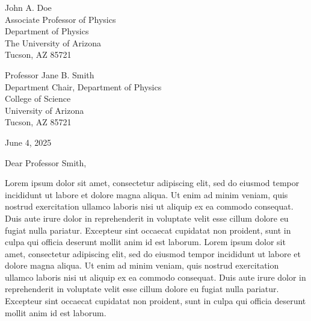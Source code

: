 \documentclass[11pt]{letter}
\begin{document}
\vspace*{2\baselineskip}

{\hfill
\begin{minipage}{0.45\textwidth}
John A. Doe\\
Associate Professor of Physics\\
Department of Physics\\
The University of Arizona\\
Tucson, AZ 85721\\
\end{minipage}
}

\vspace{1\baselineskip}

\begin{minipage}{0.45\textwidth}
Professor Jane B. Smith\\
Department Chair, Department of Physics\\
College of Science\\
University of Arizona\\
Tucson, AZ 85721
\end{minipage}

\vspace{1\baselineskip}

\begin{flushright}
June 4, 2025
\end{flushright}

\vspace{1\baselineskip}

Dear Professor Smith,

\vspace{1\baselineskip}

Lorem ipsum dolor sit amet, consectetur adipiscing elit, sed do eiusmod tempor incididunt ut labore et dolore magna aliqua. Ut enim ad minim veniam, quis nostrud exercitation ullamco laboris nisi ut aliquip ex ea commodo consequat. Duis aute irure dolor in reprehenderit in voluptate velit esse cillum dolore eu fugiat nulla pariatur. Excepteur sint occaecat cupidatat non proident, sunt in culpa qui officia deserunt mollit anim id est laborum. Lorem ipsum dolor sit amet, consectetur adipiscing elit, sed do eiusmod tempor incididunt ut labore et dolore magna aliqua. Ut enim ad minim veniam, quis nostrud exercitation ullamco laboris nisi ut aliquip ex ea commodo consequat. Duis aute irure dolor in reprehenderit in voluptate velit esse cillum dolore eu fugiat nulla pariatur. Excepteur sint occaecat cupidatat non proident, sunt in culpa qui officia deserunt mollit anim id est laborum.
\end{document}
